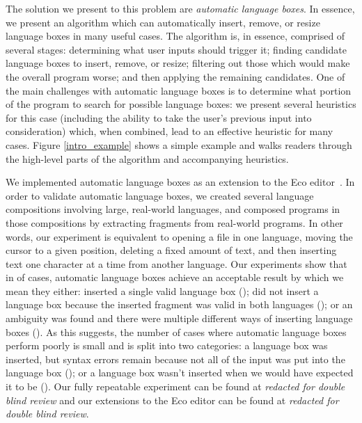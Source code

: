 \documentclass[sigplan,screen]{acmart}\settopmatter{printfolios=true,printccs=false,printacmref=false}
\begin{document}
The solution we present to this problem are \emph{automatic language boxes}. In
essence, we present an algorithm which can automatically insert, remove, or resize language
boxes in many useful cases. The algorithm is, in essence, comprised of several
stages: determining what user inputs should trigger it; finding candidate language
boxes to insert, remove, or resize; filtering out those which would make the
overall program worse; and then applying the remaining candidates. One of the main challenges with
automatic language boxes is to determine what portion of the program to search
for possible language boxes: we present several heuristics for this case
(including the ability to take the user's previous input into consideration)
which, when combined, lead to an effective heuristic for many cases. Figure
\ref{intro_example} shows a simple example and walks readers through the high-level
parts of the algorithm and accompanying heuristics.

We implemented automatic language boxes as an extension to the Eco
editor~\cite{diekmann14eco}. In order to validate automatic language boxes, we
created several language compositions involving large, real-world languages,
and composed programs in those compositions by extracting fragments from real-world programs.
In other words, our experiment is equivalent to opening a file
in one language, moving the cursor to a given position, deleting a fixed amount
of text, and then inserting text one character at a time from another language.
Our experiments show that in \validalloverall of cases, automatic language boxes achieve an
acceptable result by which we mean they either: inserted a single valid
language box (\breakdownallvalid); did not insert a language box because the
inserted fragment was valid in both languages (\breakdownallnovalid); or an ambiguity
was found and there were multiple different ways of inserting language boxes
(\breakdownallnomulti). As this suggests, the number of cases where automatic
language boxes perform poorly is small and is split into two categories: a
language box was inserted, but syntax errors remain because not all of the
input was put into the language box (\breakdownallinvalid); or a language box wasn't
inserted when we would have expected it to be (\breakdownallnoerror). Our fully
repeatable experiment can be found at \emph{redacted for double blind review}
and our extensions to the Eco editor can be found at \emph{redacted for double
blind review}.
\end{document}
